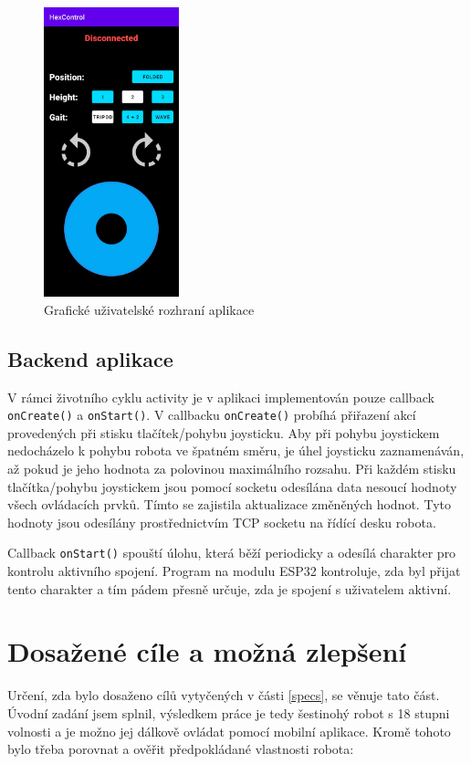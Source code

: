 \begin{figure}[hbt]
	\centering
	\includegraphics[width=0.35\textwidth]{obrazky-figures/appgui.jpg}
	\caption{Grafické uživatelské rozhraní aplikace}
    \label{appgui}
\end{figure}

\subsection*{Backend aplikace}
V rámci životního cyklu activity je v aplikaci implementován pouze callback \texttt{onCreate()} a \texttt{onStart()}. V callbacku \texttt{onCreate()} probíhá přiřazení akcí provedených při stisku tlačítek/pohybu joysticku. Aby při pohybu joystickem nedocházelo k pohybu robota ve špatném směru, je úhel joysticku zaznamenáván, až pokud je jeho hodnota za polovinou maximálního rozsahu. Při každém stisku tlačítka/pohybu joystickem jsou pomocí socketu odesílána data nesoucí hodnoty všech ovládacích prvků. Tímto se zajistila aktualizace změněných hodnot. Tyto hodnoty jsou odesílány prostřednictvím TCP socketu na řídící desku robota.

Callback \texttt{onStart()} spouští úlohu, která běží periodicky a odesílá charakter pro kontrolu aktivního spojení. Program na modulu ESP32 kontroluje, zda byl přijat tento charakter a tím pádem přesně určuje, zda je spojení s uživatelem aktivní.


\pagebreak

\section{Dosažené cíle a možná zlepšení}
\label{secResults}
Určení, zda bylo dosaženo cílů vytyčených v části \ref{specs}, se věnuje tato část. Úvodní zadání jsem splnil, výsledkem práce je tedy šestinohý robot s 18 stupni volnosti a je možno jej dálkově ovládat pomocí mobilní aplikace. Kromě tohoto bylo třeba porovnat a ověřit předpokládané vlastnosti robota:

